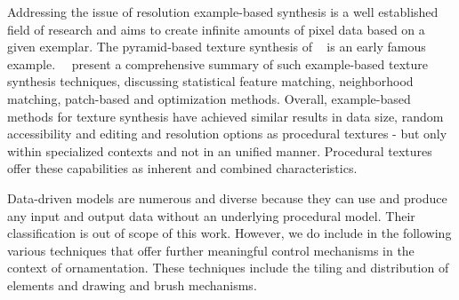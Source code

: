 Addressing the issue of resolution example-based synthesis is a well established field of research and aims to create infinite amounts of pixel data based on a given exemplar. The pyramid-based texture synthesis of \citeauthor*{heeger_1995_pbt}~\cite{heeger_1995_pbt} is an early famous example.~\citeauthor*{wei_2009_seb}~\cite{wei_2009_seb} present a comprehensive summary of such example-based texture synthesis techniques, discussing statistical feature matching, neighborhood matching, patch-based and optimization methods. Overall, example-based methods for texture synthesis have achieved similar results in data size, random accessibility and editing and resolution options as procedural textures - but only within specialized contexts and not in an unified manner. Procedural textures offer these capabilities as inherent and combined characteristics.

Data-driven models are numerous and diverse because they can use and produce any input and output data without an underlying procedural model. Their classification is out of scope of this work. However, we do include in the following various techniques that offer further meaningful control mechanisms in the context of ornamentation. These techniques include the tiling and distribution of elements and drawing and brush mechanisms.

